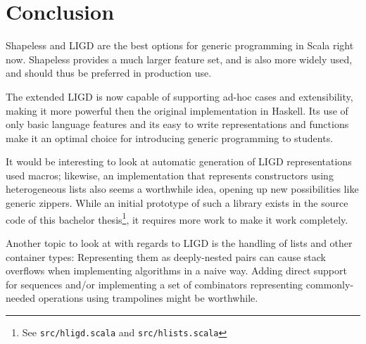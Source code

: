 \chapter{Conclusion}
Shapeless and LIGD are the best options for generic programming in Scala
right now. Shapeless provides a much larger feature set, and is also more
widely used, and should thus be preferred in production use.

The extended LIGD is now capable of supporting ad-hoc cases and extensibility,
making it more powerful then the original implementation in Haskell. Its use
of only basic language features and its easy to write representations and
functions make it an optimal choice for introducing generic programming to
students.

It would be interesting to look at automatic generation of LIGD representations
used macros; likewise, an implementation that represents constructors using
heterogeneous lists also seems a worthwhile idea, opening up new possibilities
like generic zippers. While an initial prototype of such a library exists in
the source code of this bachelor thesis\footnote{See \texttt{src/hligd.scala} and
\texttt{src/hlists.scala}}, it requires more work to make it work completely.

Another topic to look at with regards to LIGD is the handling of lists and
other container types: Representing them as deeply-nested pairs can cause
stack overflows when implementing algorithms in a naive way. Adding direct
support for sequences and/or implementing a set of combinators representing
commonly-needed operations using trampolines might be worthwhile.
